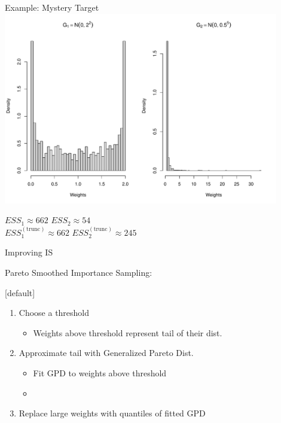 \documentclass[14pt]{beamer}
\begin{document}
\begin{frame}{Example: Mystery Target}
    \centering
    \includegraphics[height=0.7\textheight, width=0.9\textwidth, keepaspectratio]{Figures/Wt Hist - Trunc.pdf} \newline
    \begin{outline}
        $ESS_1 \approx 662$ \hspace{2.5cm} $ESS_2 \approx 54$\\
        $ESS_1^{(\mathrm{trunc})} \approx 662$ \hspace{2.5cm} $ESS_2^{(\mathrm{trunc})} \approx 245$
    \end{outline}
\end{frame}


\begin{frame}{Improving IS}
    \begin{outline}
    \1 Pareto Smoothed Importance Sampling:
        \2 \citep{Veh24} \newline
    \end{outline}

    [default]
    \begin{enumerate}
    \item Choose a threshold
        \begin{itemize}
            \item Weights above threshold represent tail of their dist.
        \end{itemize}
    \item Approximate tail with Generalized Pareto Dist.
    \begin{itemize}
        \item Fit GPD to weights above threshold
        \item \citep{Zha09}
    \end{itemize}
    \item Replace large weights with quantiles of fitted GPD
    \end{enumerate}
\end{frame}
\end{document}
